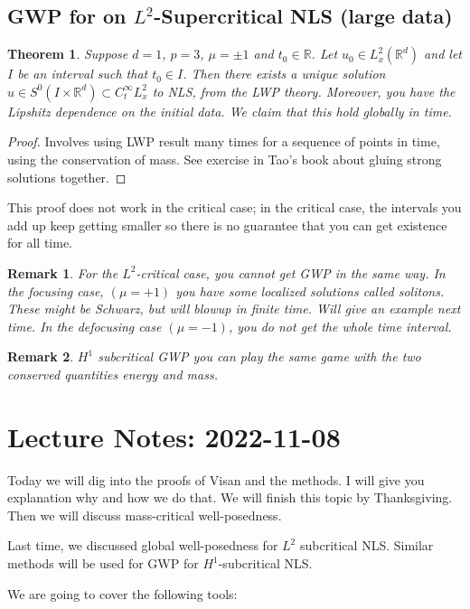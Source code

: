\documentclass{article}
\newtheorem{theorem}{Theorem}
\newtheorem{remark}{Remark}
\def\R{\mathbb{R}} %
\begin{document}
\subsection{GWP for on $L^2$-Supercritical NLS (large data)}
\begin{theorem}
  Suppose $d=1$, $p=3$, $\mu=\pm 1$ and $t_{0}\in \R$. Let
  $u_{0}\in L_{x}^{2}(\R^d)$ and let $I$ be an interval such that $t_{0}\in I$.
  Then there exists a unique solution
  $u\in S^{0}(I\times \R^d)\subset C_{t}^{\infty}L_{x}^{2}$ to NLS, from the LWP
  theory. Moreover,
  you have the Lipshitz dependence on the initial data. We claim that this hold
  globally in time.
\end{theorem}
\begin{proof}
  Involves using LWP result many times for a sequence of points in time, using
  the conservation of mass. See exercise in Tao's book about gluing strong
  solutions together.
\end{proof}
This proof does not work in the critical case; in the critical case, the
intervals you add up keep getting smaller so there is no guarantee that you can
get existence for all time.


\begin{remark}
  For the $L^2$-critical case, you cannot get GWP in the same way. In the
  focusing case, $(\mu=+1)$ you have some localized solutions called solitons.
  These might be Schwarz, but will blowup in finite time. Will give an example
  next time. In the defocusing case $(\mu=-1)$, you do not get the whole time
  interval. 
\end{remark}
\begin{remark}
  $H^{1}$ subcritical GWP you can play the same game with the two conserved
  quantities energy and mass.
\end{remark}

\section{Lecture Notes: 2022-11-08}
Today we will dig into the proofs of Visan and the methods. I will give you
explanation why and how we do that. We will finish this topic by Thanksgiving.
Then we will discuss mass-critical well-posedness.

Last time, we discussed global well-posedness for $L^2$ subcritical NLS. Similar
methods will be used for GWP for $H^{1}$-subcritical NLS.

We are going to cover the following tools:
\end{document}
